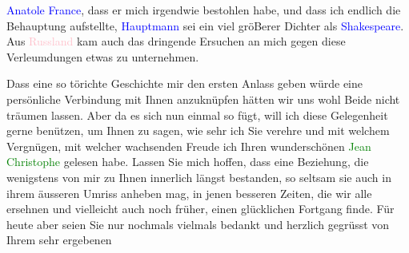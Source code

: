                \textcolor{blue}{Anatole France}\ledrightnote{\textcolor{blue}{Anatole France}}, dass er mich irgendwie bestohlen
               habe, und dass ich endlich die Behauptung aufstellte, \textcolor{blue}{Hauptmann}\ledrightnote{\textcolor{blue}{Gerhart Hauptmann}} sei ein viel gröBerer Dichter als \textcolor{blue}{Shakespeare}\ledrightnote{\textcolor{blue}{William Shakespeare}}. Aus \textcolor{pink}{Russland}\ledrightnote{\textcolor{pink}{Russland}} kam auch das
               dringende Ersuchen an mich gegen diese Verleumdungen etwas zu unternehmen.\pend
           
\pstart
           Dass eine so törichte Geschichte mir den ersten Anlass geben würde eine persönliche
               Verbindung mit Ihnen anzuknüpfen hätten wir uns wohl Beide nicht träumen lassen. Aber
               da es sich nun einmal so fügt, will ich diese Gelegenheit gerne benützen, um Ihnen zu
               sagen, wie sehr ich Sie verehre und mit welchem Vergnügen, mit welcher wachsenden
               Freude ich Ihren wunderschönen \textcolor{green}{Jean Christophe}\ledrightnote{\textcolor{green}{Jean Christophe}} gelesen
               habe. Lassen Sie mich hoffen, dass eine Beziehung, die wenigstens von mir zu Ihnen
               innerlich längst bestanden, so seltsam sie auch in ihrem äusseren Umriss anheben mag,
               in jenen besseren Zeiten, die wir alle ersehnen und vielleicht auch noch früher,
               einen glücklichen Fortgang finde. Für heute aber seien Sie nur nochmals vielmals
               bedankt und herzlich gegrüsst von\pend
           \pstart Ihrem sehr ergebenen\pend{}\endnumbering{}
\begin{anhang}
\end{anhang}
      